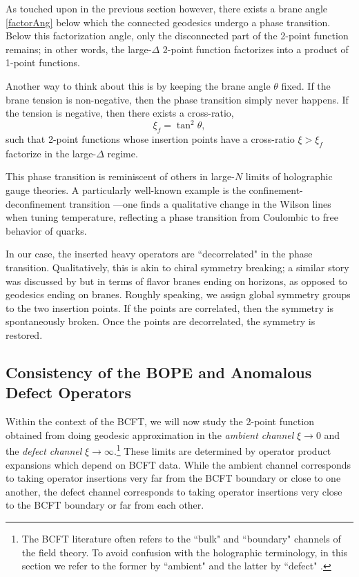 \documentclass[reprint,amsmath,amssymb,aps,nofootinbib,twocolumn]{revtex4-2}
\begin{document}
As touched upon in the previous section however, there exists a brane angle \eqref{factorAng} below which the connected geodesics undergo a phase transition. Below this factorization angle, only the disconnected part of the 2-point function remains; in other words, the large-$\Delta$ 2-point function factorizes into a product of 1-point functions.

Another way to think about this is by keeping the brane angle $\theta$ fixed. If the brane tension is non-negative, then the phase transition simply never happens. If the tension is negative, then there exists a cross-ratio,
\begin{equation}
\xi_f = \tan^2\theta,
\end{equation}
such that 2-point functions whose insertion points have a cross-ratio $\xi > \xi_f$ factorize in the large-$\Delta$ regime.

This phase transition is reminiscent of others in large-$N$ limits of holographic gauge theories. A particularly well-known example is the confinement-deconfinement transition \cite{Witten:1998zw,Brandhuber:1998bs}---one finds a qualitative change in the Wilson lines when tuning temperature, reflecting a phase transition from Coulombic to free behavior of quarks.

In our case, the inserted heavy operators are ``decorrelated" in the phase transition. Qualitatively, this is akin to chiral symmetry breaking; a similar story was discussed by \cite{Johnson:2008vna} but in terms of flavor branes \cite{Karch:2002sh} ending on horizons, as opposed to geodesics ending on branes. Roughly speaking, we assign global symmetry groups to the two insertion points. If the points are correlated, then the symmetry is spontaneously broken. Once the points are decorrelated, the symmetry is restored.

\subsection{Consistency of the BOPE and Anomalous Defect Operators}

Within the context of the BCFT, we will now study the 2-point function obtained from doing geodesic approximation in the \textit{ambient channel} $ \xi \rightarrow 0 $ and the \textit{defect channel} $ \xi\rightarrow \infty $.\footnote{The BCFT literature \cite{Liendo:2012hy,Mazac:2018biw} often refers to the ``bulk" and ``boundary" channels of the field theory. To avoid confusion with the holographic terminology, in this section we refer to the former by ``ambient" and the latter by ``defect" \cite{aharony_defect_2003,Karch:2017fuh}.} These limits are determined by operator product expansions which depend on BCFT data. While the ambient channel corresponds to taking operator insertions very far from the BCFT boundary or close to one another, the defect channel corresponds to taking operator insertions very close to the BCFT boundary or far from each other.
\end{document}
